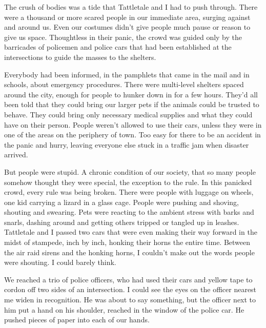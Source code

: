 





The crush of bodies was a tide that Tattletale and I had to push through.  There were a thousand or more scared people in our immediate area, surging against and around us.  Even our costumes didn't give people much pause or reason to give us space.  Thoughtless in their panic, the crowd was guided only by the barricades of policemen and police cars that had been established at the intersections to guide the masses to the shelters.



Everybody had been informed, in the pamphlets that came in the mail and in schools, about emergency procedures.  There were multi-level shelters spaced around the city, enough for people to hunker down in for a few hours.  They'd all been told that they could bring our larger pets if the animals could be trusted to behave.  They could bring only necessary medical supplies and what they could have on their person.  People weren't allowed to use their cars, unless they were in one of the areas on the periphery of town.  Too easy for there to be an accident in the panic and hurry, leaving everyone else stuck in a traffic jam when disaster arrived.



But people were stupid.  A chronic condition of our society, that so many people somehow thought they were special, the exception to the rule.  In this panicked crowd, every rule was being broken.  There were people with luggage on wheels, one kid carrying a lizard in a glass cage.  People were pushing and shoving, shouting and swearing.  Pets were reacting to the ambient stress with barks and snarls, dashing around and getting others tripped or tangled up in leashes.  Tattletale and I passed two cars that were even making their way forward in the midst of stampede, inch by inch, honking their horns the entire time.  Between the air raid sirens and the honking horns, I couldn't make out the words people were shouting.  I could barely think.



We reached a trio of police officers, who had used their cars and yellow tape to cordon off two sides of an intersection.  I could see the eyes on the officer nearest me widen in recognition.  He was about to say something, but the officer next to him put a hand on his shoulder, reached in the window of the police car.  He pushed pieces of paper into each of our hands.



